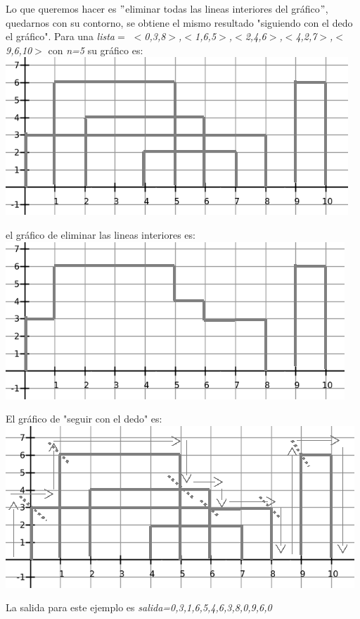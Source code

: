 \documentclass{article}
\begin{document}
Lo que queremos hacer es $"$eliminar todas las lineas interiores del gr\'afico$"$, quedarnos con su contorno, se obtiene el mismo resultado  "siguiendo con el dedo el gr\'afico". \newpage
Para una \textit{lista$=$ $<$0,3,8$>$,$<$1,6,5$>$,$<$2,4,6$>$,$<$4,2,7$>$,$<$9,6,10$>$} con \textit{n=5} su gr\'afico es: \newline
\includegraphics[width=\textwidth,height=\textheight,keepaspectratio
]{edificiosGraf2.png}
\begin {flushleft}
\end{flushleft}
el gr\'afico de eliminar las lineas interiores es:\newline
\includegraphics[width=\textwidth,height=\textheight,keepaspectratio
]{edificiosGraf2b.png}
\begin {flushleft}
\end{flushleft}
\newpage
El gr\'afico de "seguir con el dedo" es: \newline
\includegraphics[width=\textwidth,height=\textheight,keepaspectratio
]{edificiosGraf2c.png}
\begin {flushleft}
La salida para este ejemplo es \textit{salida={0,3,1,6,5,4,6,3,8,0,9,6,0}}
\end{flushleft}
\end{document}
